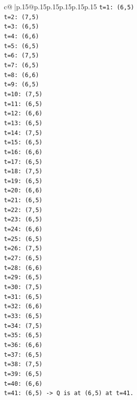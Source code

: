 \documentclass{article}
\begin{document}
{\begin{supertabular}{c@{$\;$}|p{.15\linewidth}@{}p{.15\linewidth}p{.15\linewidth}p{.15\linewidth}p{.15\linewidth}p{.15\linewidth}}
{{{\texttt{t=1: (6,5)} \\
\texttt{t=2: (7,5)} \\
\texttt{t=3: (6,5)} \\
\texttt{t=4: (6,6)} \\
\texttt{t=5: (6,5)} \\
\texttt{t=6: (7,5)} \\
\texttt{t=7: (6,5)} \\
\texttt{t=8: (6,6)} \\
\texttt{t=9: (6,5)} \\
\texttt{t=10: (7,5)} \\
\texttt{t=11: (6,5)} \\
\texttt{t=12: (6,6)} \\
\texttt{t=13: (6,5)} \\
\texttt{t=14: (7,5)} \\
\texttt{t=15: (6,5)} \\
\texttt{t=16: (6,6)} \\
\texttt{t=17: (6,5)} \\
\texttt{t=18: (7,5)} \\
\texttt{t=19: (6,5)} \\
\texttt{t=20: (6,6)} \\
\texttt{t=21: (6,5)} \\
\texttt{t=22: (7,5)} \\
\texttt{t=23: (6,5)} \\
\texttt{t=24: (6,6)} \\
\texttt{t=25: (6,5)} \\
\texttt{t=26: (7,5)} \\
\texttt{t=27: (6,5)} \\
\texttt{t=28: (6,6)} \\
\texttt{t=29: (6,5)} \\
\texttt{t=30: (7,5)} \\
\texttt{t=31: (6,5)} \\
\texttt{t=32: (6,6)} \\
\texttt{t=33: (6,5)} \\
\texttt{t=34: (7,5)} \\
\texttt{t=35: (6,5)} \\
\texttt{t=36: (6,6)} \\
\texttt{t=37: (6,5)} \\
\texttt{t=38: (7,5)} \\
\texttt{t=39: (6,5)} \\
\texttt{t=40: (6,6)} \\
\texttt{t=41: (6,5) {-}> Q is at (6,5) at t=41.} \\
}}}
\end{supertabular}}
\end{document}
